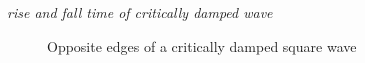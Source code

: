 \documentclass[11pt]{article}
\begin{document}
{\em rise and fall time of critically damped wave}
\begin{figure}[h]
	\centering
	\caption{Opposite edges of a critically damped square wave}
	\label{fig:rise_fall}
\end{figure}
\end{document}
